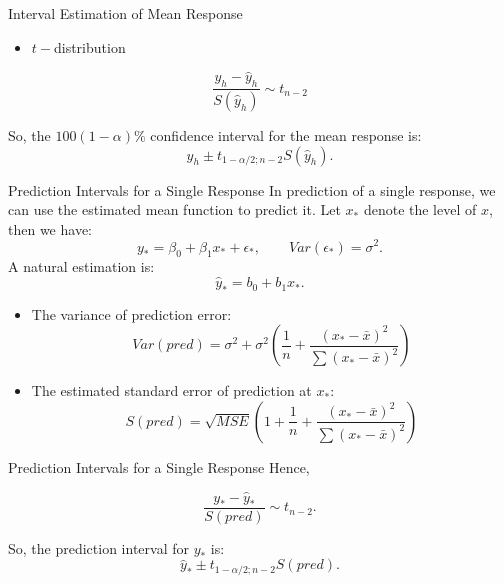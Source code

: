 \documentclass[
  ignorenonframetext,
]{beamer}
\providecommand{\tightlist}{%
  \setlength{\itemsep}{0pt}\setlength{\parskip}{0pt}}
\begin{document}
\begin{frame}{Interval Estimation of Mean Response}
\label{interval-estimation-of-mean-response-1}
\begin{itemize}
\tightlist
\item
  \(t-\)distribution
\end{itemize}

\[\frac{y_h-\hat{y}_h}{S(\hat{y}_h)}\sim t_{n-2}\]

So, the \(100(1-\alpha)\%\) confidence interval for the mean response
is: \[\hat{y}_h\pm t_{1 -\alpha/2; n-2}S(\hat{y}_h).\]
\end{frame}

\begin{frame}{Prediction Intervals for a Single Response}
\label{prediction-intervals-for-a-single-response}
In prediction of a single response, we can use the estimated mean
function to predict it. Let \(x_*\) denote the level of \(x\), then we
have:
\[ y_*=\beta_0+\beta_1x_*+\epsilon_*, \quad \quad Var(\epsilon_*)=\sigma^2.\]
A natural estimation is: \[ \hat{y}_*=b_0+b_1x_*.\]

\begin{itemize}
\tightlist
\item
  The variance of prediction error:
  \[ Var(pred)=\sigma^2+\sigma^2\left(\frac{1}{n}+\frac{(x_* -\bar{x})^2}{\sum (x_* -\bar{x})^2}\right)\]
\item
  The estimated standard error of prediction at \(x_*\):
  \[S(pred)=\sqrt{MSE}\left(1+\frac{1}{n}+\frac{(x_* -\bar{x})^2}{\sum (x_* -\bar{x})^2}\right)\]
\end{itemize}
\end{frame}

\begin{frame}{Prediction Intervals for a Single Response}
\label{prediction-intervals-for-a-single-response-1}
Hence,

\[\frac{y_*-\hat{y}_*}{S(pred)}\sim t_{n-2}.\]

So, the prediction interval for \(y_*\) is:
\[\hat{y}_*\pm t_{1 - \alpha/2; n-2}S(pred).\]
\end{frame}
\end{document}
